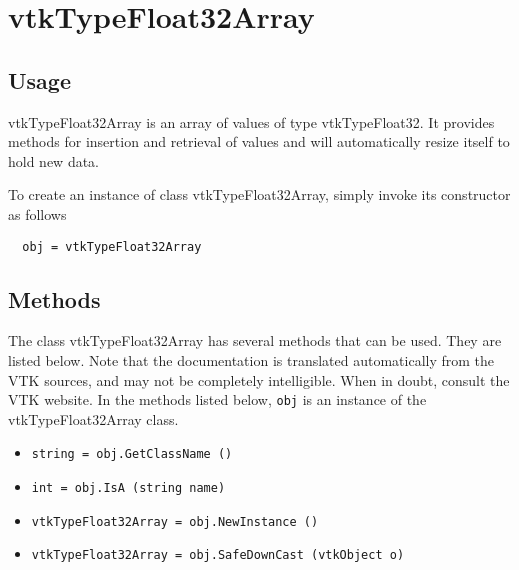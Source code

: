\section{vtkTypeFloat32Array}

\subsection{Usage}

 vtkTypeFloat32Array is an array of values of type vtkTypeFloat32.  It
 provides methods for insertion and retrieval of values and will
 automatically resize itself to hold new data.

To create an instance of class vtkTypeFloat32Array, simply
invoke its constructor as follows
\begin{verbatim}
  obj = vtkTypeFloat32Array
\end{verbatim}
\subsection{Methods}

The class vtkTypeFloat32Array has several methods that can be used.
  They are listed below.
Note that the documentation is translated automatically from the VTK sources,
and may not be completely intelligible.  When in doubt, consult the VTK website.
In the methods listed below, \verb|obj| is an instance of the vtkTypeFloat32Array class.
\begin{itemize}
\item  \verb|string = obj.GetClassName ()|

\item  \verb|int = obj.IsA (string name)|

\item  \verb|vtkTypeFloat32Array = obj.NewInstance ()|

\item  \verb|vtkTypeFloat32Array = obj.SafeDownCast (vtkObject o)|

\end{itemize}
